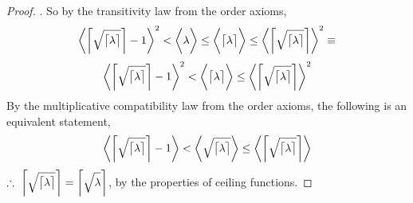 \documentclass[preview]{standalone}
\begin{document}
\begin{proof}
    .
    So by the transitivity law from the order axioms,
    \begin{equation*}
        \bigg \langle
            \bigg \lceil
                \sqrt{ \strut \big \lceil \lambda \big \rceil }
            \bigg \rceil
                -
            1
        \bigg \rangle
            ^2
            <
        \bigg \langle
            \lambda
        \bigg \rangle
            \leq
        \bigg \langle
            \big \lceil \lambda \big \rceil
        \bigg \rangle
            \leq
        \bigg \langle
            \bigg \lceil
                \sqrt{ \strut \big \lceil \lambda \big \rceil }
            \bigg \rceil
        \bigg \rangle
            ^2
            \equiv
    \end{equation*}
    \begin{equation*}
        \bigg \langle
            \bigg \lceil
                \sqrt{ \strut \big \lceil \lambda \big \rceil }
            \bigg \rceil
                -
            1
        \bigg \rangle
            ^2
            <
        \bigg \langle
            \big \lceil \lambda \big \rceil
        \bigg \rangle
            \leq
        \bigg \langle
            \bigg \lceil
                \sqrt{ \strut \big \lceil \lambda \big \rceil }
            \bigg \rceil
        \bigg \rangle
            ^2
    \end{equation*}
    By the multiplicative compatibility law from the order axioms,
    the following is an equivalent statement,
    \begin{equation*}
        \bigg \langle
            \bigg \lceil
                \sqrt{ \strut \big \lceil \lambda \big \rceil }
            \bigg \rceil
                -
            1
        \bigg \rangle
            <
        \bigg \langle
            \sqrt{ \strut \big \lceil \lambda \big \rceil }
        \bigg \rangle
            \leq
        \bigg \langle
            \bigg \lceil
                \sqrt{ \strut \big \lceil \lambda \big \rceil }
            \bigg \rceil
        \bigg \rangle
    \end{equation*}
    $\therefore \text{\space} \relax{
        \bigg \lceil 
            \sqrt{ \strut \big \lceil \lambda \big \rceil }
        \bigg \rceil 
            = 
        \bigg \lceil \sqrt{ \strut \lambda } \bigg \rceil
    }$, by the properties of ceiling functions.
\color{lightgray} \end{proof}
\end{document}
